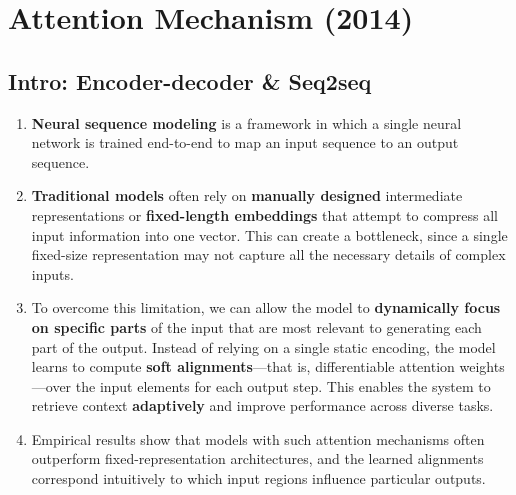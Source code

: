 \chapter{Attention Mechanism (2014)}

\begin{tcolorbox}
\end{tcolorbox}


\section{Intro: Encoder-decoder \& Seq2seq}

\begin{enumerate}
    \item \textbf{Neural sequence modeling} is a framework in which a single neural network is trained end-to-end to map an input sequence to an output sequence. 
    \hfill \cite{arxiv/1409.0473/NMT-Jointly-Learning-Align-Translate, common/online/chatgpt}

    \item \textbf{Traditional models} often rely on \textbf{manually designed} intermediate representations or \textbf{fixed-length embeddings} that attempt to compress all input information into one vector. 
    This can create a bottleneck, since a single fixed-size representation may not capture all the necessary details of complex inputs. 
    \hfill \cite{arxiv/1409.0473/NMT-Jointly-Learning-Align-Translate, common/online/chatgpt}

    \item To overcome this limitation, we can allow the model to \textbf{dynamically focus on specific parts} of the input that are most relevant to generating each part of the output. 
    Instead of relying on a single static encoding, the model learns to compute \textbf{soft alignments}—that is, differentiable attention weights—over the input elements for each output step. 
    This enables the system to retrieve context \textbf{adaptively} and improve performance across diverse tasks.
    \hfill \cite{arxiv/1409.0473/NMT-Jointly-Learning-Align-Translate, common/online/chatgpt}

    \item Empirical results show that models with such attention mechanisms often outperform fixed-representation architectures, and the learned alignments correspond intuitively to which input regions influence particular outputs.
    \hfill \cite{arxiv/1409.0473/NMT-Jointly-Learning-Align-Translate, common/online/chatgpt}


\end{enumerate}
